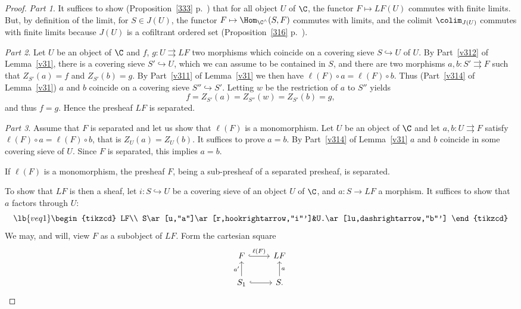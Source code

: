 \documentclass[12pt]{article}
\theoremstyle{remark}
\theoremstyle{definition}
\begin{document}
\begin{proof}
\emph{Part 1}. It suffices to show (Proposition~\ref{333} p.~\pageref{333}) that for all object $U$ of $\C$, the functor $F\mapsto LF(U)$ commutes with finite limits. But, by definition of the limit, for $S\in J(U)$, the functor $F\mapsto\Hom_{\C^\wedge}(S,F)$ commutes with limits, and the colimit $\colim_{J(U)}$ commutes with finite limits because $J(U)$ is a cofiltrant ordered set (Proposition~\ref{316} p.~\pageref{316}).

\noindent\emph{Part 2}. Let $U$ be an object of $\C$ and $f$, $g:U\rightrightarrows LF$ two morphisms which coincide on a covering sieve $S\hookrightarrow U$ of $U$. By Part~\ref{v312} of Lemma~\ref{v31}, there is a covering sieve $S'\hookrightarrow U$, which we can assume to be contained in $S$, and there are two morphisms $a,b:S'\rightrightarrows F$ such that $Z_{S'}(a)=f$ and $Z_{S'}(b)=g$. By Part~\ref{v311} of Lemma~\ref{v31} we then have $\ell(F)\circ a=\ell(F)\circ b$. Thus (Part~\ref{v314} of Lemma~\ref{v31}) $a$ and $b$ coincide on a covering sieve $S''\hookrightarrow S'$. Letting $w$ be the restriction of $a$ to $S''$ yields 
$$
f=Z_{S'}(a)=Z_{S''}(w)=Z_{S'}(b)=g,
$$ 
and thus $f=g$. Hence the presheaf $LF$ is separated.

\noindent\emph{Part 3}. %
Assume that $F$ is separated and let us show that $\ell(F)$ is a monomorphism. Let $U$ be an object of $\C$ and let $a,b:U\rightrightarrows F$ satisfy $\ell(F)\circ a=\ell(F)\circ b$, that is $Z_U(a)=Z_U(b)$. It suffices to prove $a=b$. By Part~\ref{v314} of Lemma~\ref{v31} $a$ and $b$ coincide in some covering sieve of $U$. Since $F$ is separated, this implies $a=b$. 

If $\ell(F)$ is a monomorphism, the presheaf $F$, being a sub-presheaf of a separated presheaf, is separated. 

To show that $LF$ is then a sheaf, let $i:S\hookrightarrow U$ be a covering sieve of an object $U$ of $\C$, and $a:S\to LF$ a morphism. It suffices to show that $a$ factors through $U$:
\begin{equation}\lb{veq1}
\begin{tikzcd}
LF\\ 
S\ar[u,"a"]\ar[r,hookrightarrow,"i"']&U.\ar[lu,dashrightarrow,"b"']
\end{tikzcd}
\end{equation}
We may, and will, view $F$ as a subobject of $LF$. Form the cartesian square 
$$
\begin{tikzcd}
F\ar[r,hookrightarrow,"\ell(F)"]&LF\\ 
S_1\ar[u,"a'"]\ar[r,hookrightarrow]&S.\ar[u,"a"']
\end{tikzcd}
$$ 


\end{proof}
\end{document}
